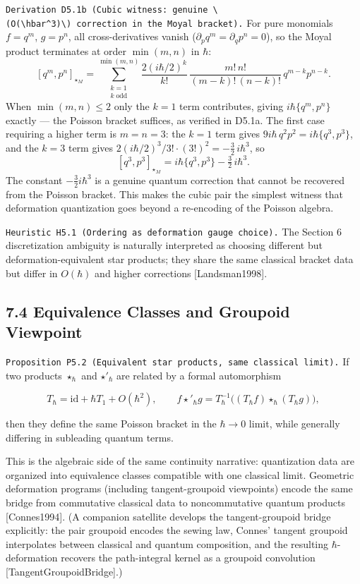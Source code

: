 \documentclass[
]{article}
\begin{document}
\texttt{Derivation\ D5.1b\ (Cubic\ witness:\ genuine\ \textbackslash{}(O(\textbackslash{}hbar\^{}3)\textbackslash{})\ correction\ in\ the\ Moyal\ bracket).}
For pure monomials \(f=q^m\), \(g=p^n\), all cross-derivatives vanish
(\(\partial_p q^m=\partial_q p^n=0\)), so the Moyal product terminates
at order \(\min(m,n)\) in \(\hbar\):
\[[q^m,p^n]_{\star_M}=\sum_{\substack{k=1\\k\;\mathrm{odd}}}^{\min(m,n)}\frac{2(i\hbar/2)^k}{k!}\,\frac{m!\,n!}{(m\!-\!k)!\,(n\!-\!k)!}\,q^{m-k}p^{n-k}.\]
When \(\min(m,n)\le 2\) only the \(k=1\) term contributes, giving
\(i\hbar\{q^m,p^n\}\) exactly --- the Poisson bracket suffices, as
verified in D5.1a. The first case requiring a higher term is \(m=n=3\):
the \(k=1\) term gives \(9i\hbar\,q^2p^2=i\hbar\{q^3,p^3\}\), and the
\(k=3\) term gives \(2(i\hbar/2)^3/3!\cdot(3!)^2=-\tfrac32\,i\hbar^3\),
so \[[q^3,p^3]_{\star_M}=i\hbar\{q^3,p^3\}-\tfrac32\,i\hbar^3.\] The
constant \(-\tfrac32 i\hbar^3\) is a genuine quantum correction that
cannot be recovered from the Poisson bracket. This makes the cubic pair
the simplest witness that deformation quantization goes beyond a
re-encoding of the Poisson algebra.

\texttt{Heuristic\ H5.1\ (Ordering\ as\ deformation\ gauge\ choice).}
The Section 6 discretization ambiguity is naturally interpreted as
choosing different but deformation-equivalent star products; they share
the same classical bracket data but differ in \(O(\hbar)\) and higher
corrections {[}Landsman1998{]}.

\hypertarget{equivalence-classes-and-groupoid-viewpoint}{%
\subsection{7.4 Equivalence Classes and Groupoid
Viewpoint}\label{equivalence-classes-and-groupoid-viewpoint}}

\texttt{Proposition\ P5.2\ (Equivalent\ star\ products,\ same\ classical\ limit).}
If two products \(\star_\hbar\) and \(\star'_\hbar\) are related by a
formal automorphism

\[
T_\hbar=\mathrm{id}+\hbar T_1+O(\hbar^2),
\qquad
f\star'_\hbar g
=
T_\hbar^{-1}\!\big((T_\hbar f)\star_\hbar(T_\hbar g)\big),
\]

then they define the same Poisson bracket in the \(\hbar\to0\) limit,
while generally differing in subleading quantum terms.

This is the algebraic side of the same continuity narrative:
quantization data are organized into equivalence classes compatible with
one classical limit. Geometric deformation programs (including
tangent-groupoid viewpoints) encode the same bridge from commutative
classical data to noncommutative quantum products {[}Connes1994{]}. (A
companion satellite develops the tangent-groupoid bridge explicitly: the
pair groupoid encodes the sewing law, Connes' tangent groupoid
interpolates between classical and quantum composition, and the
resulting \(\hbar\)-deformation recovers the path-integral kernel as a
groupoid convolution {[}TangentGroupoidBridge{]}.)
\end{document}
